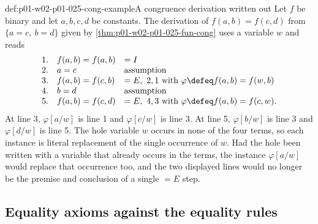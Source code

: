 \begin{hbexample}{def:p01-w02-p01-025-cong-example}{A congruence derivation written out}
Let \(f\) be binary and let \(a,b,c,d\) be constants.  The derivation of
\(f(a,b)=f(c,d)\) from \(\{a=c,\ b=d\}\) given by
\cref{thm:p01-w02-p01-025-fun-cong} uses a variable \(w\) and reads
\[
\begin{array}{rll}
1.&f(a,b)=f(a,b)&=I\\
2.&a=c&\text{assumption}\\
3.&f(a,b)=f(c,b)&=E,\ 2,1\ \text{with }\varphi\defeq f(a,b)=f(w,b)\\
4.&b=d&\text{assumption}\\
5.&f(a,b)=f(c,d)&=E,\ 4,3\ \text{with }\varphi\defeq f(a,b)=f(c,w).
\end{array}
\]
At line 3, \(\varphi[a/w]\) is line 1 and \(\varphi[c/w]\) is line 3.  At
line 5, \(\varphi[b/w]\) is line 3 and \(\varphi[d/w]\) is line 5.  The
hole variable \(w\) occurs in none of the four terms, so each instance is
literal replacement of the single occurrence of \(w\).  Had the hole been
written with a variable that already occurs in the terms, the instance
\(\varphi[a/w]\) would replace that occurrence too, and the two displayed
lines would no longer be the premise and conclusion of a single \(=E\) step.
\end{hbexample}

\subsection{Equality axioms against the equality rules}
\label{sec:p01-w02-p01-025-equality-axioms}

